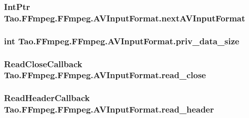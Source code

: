 \label{struct_tao_1_1_f_fmpeg_1_1_f_fmpeg_1_1_a_v_input_format_ae7ea1d279372bdeb9a4f096cd453da51}
\hypertarget{struct_tao_1_1_f_fmpeg_1_1_f_fmpeg_1_1_a_v_input_format_a8d588a0de035939448935029e0159a7f}{
\subsubsection[{nextAVInputFormat}]{\setlength{\rightskip}{0pt plus 5cm}IntPtr {\bf Tao.FFmpeg.FFmpeg.AVInputFormat.nextAVInputFormat}}}
\label{struct_tao_1_1_f_fmpeg_1_1_f_fmpeg_1_1_a_v_input_format_a8d588a0de035939448935029e0159a7f}
\hypertarget{struct_tao_1_1_f_fmpeg_1_1_f_fmpeg_1_1_a_v_input_format_aa2f69606a86705b5d0005dc326e6b956}{
\subsubsection[{priv\_\-data\_\-size}]{\setlength{\rightskip}{0pt plus 5cm}int {\bf Tao.FFmpeg.FFmpeg.AVInputFormat.priv\_\-data\_\-size}}}
\label{struct_tao_1_1_f_fmpeg_1_1_f_fmpeg_1_1_a_v_input_format_aa2f69606a86705b5d0005dc326e6b956}
\hypertarget{struct_tao_1_1_f_fmpeg_1_1_f_fmpeg_1_1_a_v_input_format_a81978a3922e515d3a274af9c1062a433}{
\subsubsection[{read\_\-close}]{\setlength{\rightskip}{0pt plus 5cm}ReadCloseCallback {\bf Tao.FFmpeg.FFmpeg.AVInputFormat.read\_\-close}}}
\label{struct_tao_1_1_f_fmpeg_1_1_f_fmpeg_1_1_a_v_input_format_a81978a3922e515d3a274af9c1062a433}
\hypertarget{struct_tao_1_1_f_fmpeg_1_1_f_fmpeg_1_1_a_v_input_format_a3bf9a1ce55e8c541c9a3ff9c1cb1609a}{
\subsubsection[{read\_\-header}]{\setlength{\rightskip}{0pt plus 5cm}ReadHeaderCallback {\bf Tao.FFmpeg.FFmpeg.AVInputFormat.read\_\-header}}}
